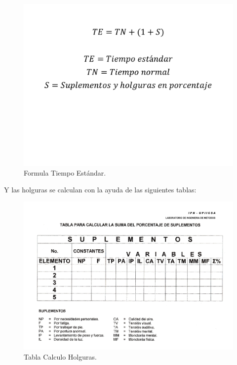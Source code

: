      \begin{figure}[H]
        \centering
        \includegraphics[scale=0.181]{21/img/formulaTiempoEstandar.pdf}
        \caption{Formula Tiempo Estándar.}
        \label{fig:formulaTiempoEstandar}
    \end{figure}
    
    Y las holguras se calculan con la ayuda de las siguientes tablas:
    
    \begin{figure}[H]
        \centering
        \includegraphics[scale=0.181]{21/img/tablaHolgurasCalculo.pdf}
        \caption{Tabla Calculo Holguras.}
        \label{fig:tablaHolgurasCalculo}
    \end{figure}
    
